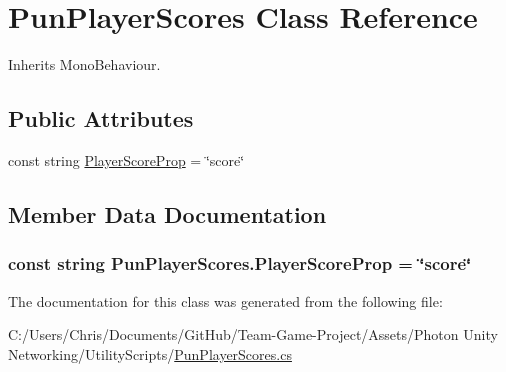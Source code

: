 \hypertarget{class_pun_player_scores}{}\section{Pun\+Player\+Scores Class Reference}
\label{class_pun_player_scores}


Inherits Mono\+Behaviour.

\subsection*{Public Attributes}
\begin{DoxyCompactItemize}
\item 
const string \hyperlink{class_pun_player_scores_a654bdaef3545c4463442239792198265}{Player\+Score\+Prop} = \char`\"{}score\char`\"{}
\end{DoxyCompactItemize}


\subsection{Member Data Documentation}
\subsubsection[{\texorpdfstring{Player\+Score\+Prop}{PlayerScoreProp}}]{\setlength{\rightskip}{0pt plus 5cm}const string Pun\+Player\+Scores.\+Player\+Score\+Prop = \char`\"{}score\char`\"{}}\hypertarget{class_pun_player_scores_a654bdaef3545c4463442239792198265}{}\label{class_pun_player_scores_a654bdaef3545c4463442239792198265}


The documentation for this class was generated from the following file\+:\begin{DoxyCompactItemize}
\item 
C\+:/\+Users/\+Chris/\+Documents/\+Git\+Hub/\+Team-\/\+Game-\/\+Project/\+Assets/\+Photon Unity Networking/\+Utility\+Scripts/\hyperlink{_pun_player_scores_8cs}{Pun\+Player\+Scores.\+cs}\end{DoxyCompactItemize}
